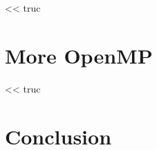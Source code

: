 \begin{savequote}[6cm]
<< truc
\end{savequote}

\chapter{More OpenMP}\label{chap:contrib:TODO}
\chaptertoc

%

\begin{savequote}[6cm]
<< truc
\end{savequote}

\chapter{Conclusion}\label{chap:contrib:TODO}
\chaptertoc

%
%
